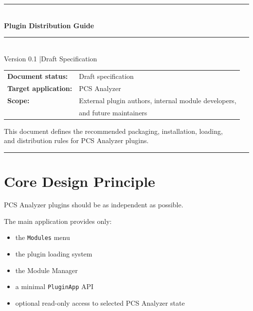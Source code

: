 \documentclass[11pt, a4paper]{article}
\begin{document}
\begin{titlepage}

  {\color{accent}\rule{\linewidth}{4pt}}
  \vspace{10mm}

  {\fontsize{9}{11}\selectfont\color{gray}}\\[4mm]
  {\fontsize{28}{34}\bfseries\selectfont Plugin Distribution Guide}\\[6mm]
  {\color{accent}\rule{60mm}{1.5pt}}\\[6mm]
  {\large\color{gray} Version 0.1 \quad|\quad Draft Specification}

  \vspace{10mm}
  {\normalsize
    \begin{tabular}{@{}ll}
      \textbf{Document status:} & Draft specification \\[2pt]
      \textbf{Target application:} & PCS Analyzer \\[2pt]
      \textbf{Scope:} & External plugin authors, internal module developers, \\
                      & and future maintainers \\
    \end{tabular}
  }

  \vfill

  {\normalsize\color{gray}
    This document defines the recommended packaging, installation, loading,\\
    and distribution rules for PCS Analyzer plugins.
  }

  \vspace{16mm}
  {\color{accent}\rule{\linewidth}{1pt}}
  \restoregeometry
\end{titlepage}

\clearpage
\tableofcontents
\clearpage

\section{Core Design Principle}

PCS Analyzer plugins should be as independent as possible.

The main application provides only:

\begin{itemize}
  \item the \texttt{Modules} menu
  \item the plugin loading system
  \item the Module Manager
  \item a minimal \texttt{PluginApp} API
  \item optional read-only access to selected PCS Analyzer state
\end{itemize}
\end{document}
